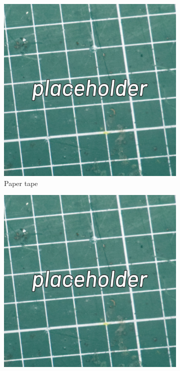 \documentclass[12pt, a4paper]{article}
\begin{document}
\begin{figure}[H]
    \centering
    \begin{subfigure}{0.3\textwidth}
        \includegraphics[width=\textwidth]{images/placeholder.jpg}
        \caption*{Paper tape}
    \end{subfigure}
    \hspace{2mm}
    \begin{subfigure}{0.3\textwidth}
        \includegraphics[width=\textwidth]{images/placeholder.jpg}

\end{subfigure}
\end{figure}
\end{document}

